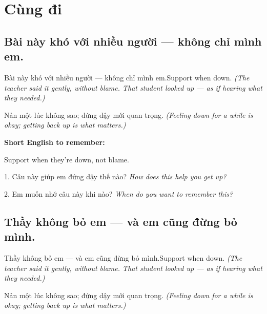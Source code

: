 \chapter{Cùng đi}


\section{Bài này khó với nhiều người — không chỉ mình em.}
\begin{truyen}{Bài này khó với nhiều người — không chỉ mình em.}{Support when down.}
\textit{(The teacher said it gently, without blame. That student looked up — as if hearing what they needed.)}
\end{truyen}

\begin{baihoc}
Nản một lúc không sao; đứng dậy mới quan trọng.
\textit{(Feeling down for a while is okay; getting back up is what matters.)}
\end{baihoc}

\begin{ghinhoanh}
\textbf{Short English to remember:}

Support when they're down, not blame.

\end{ghinhoanh}

\begin{tuhocnhanh}
1. Câu này giúp em đứng dậy thế nào? \textit{How does this help you get up?}

2. Em muốn nhớ câu này khi nào? \textit{When do you want to remember this?}
\end{tuhocnhanh}
\ngancach


\section{Thầy không bỏ em — và em cũng đừng bỏ mình.}
\begin{truyen}{Thầy không bỏ em — và em cũng đừng bỏ mình.}{Support when down.}
\textit{(The teacher said it gently, without blame. That student looked up — as if hearing what they needed.)}
\end{truyen}

\begin{baihoc}
Nản một lúc không sao; đứng dậy mới quan trọng.
\textit{(Feeling down for a while is okay; getting back up is what matters.)}
\end{baihoc}

